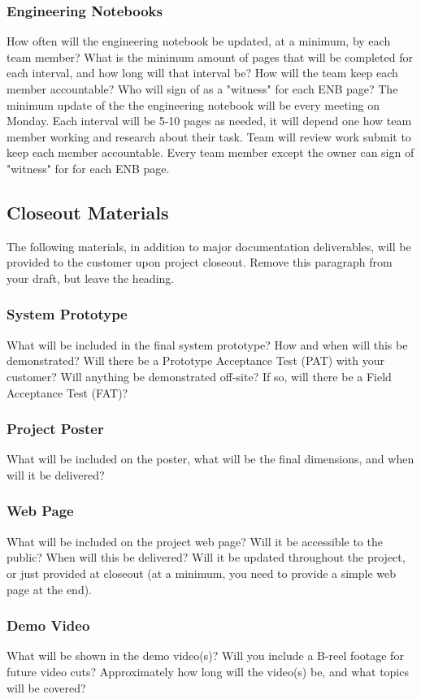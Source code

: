 \subsubsection{Engineering Notebooks}
How often will the engineering notebook be updated, at a minimum, by each team member? What is the minimum amount of pages that will be completed for each interval, and how long will that interval be? How will the team keep each member accountable? Who will sign of as a "witness" for each ENB page? 
The minimum update of the the engineering notebook will be every meeting on Monday. Each interval will be 5-10 pages as needed, it will depend one how team member working and research about their task. Team will review work submit to keep each member accountable. Every team member except the owner can sign of "witness" for for each ENB page. 
\subsection{Closeout Materials}
The following materials, in addition to major documentation deliverables, will be provided to the customer upon project closeout. Remove this paragraph from your draft, but leave the heading.

\subsubsection{System Prototype}
What will be included in the final system prototype? How and when will this be demonstrated? Will there be a Prototype Acceptance Test (PAT) with your customer? Will anything be demonstrated off-site? If so, will there be a Field Acceptance Test (FAT)?

\subsubsection{Project Poster}
What will be included on the poster, what will be the final dimensions, and when will it be delivered?

\subsubsection{Web Page}
What will be included on the project web page? Will it be accessible to the public? When will this be delivered? Will it be updated throughout the project, or just provided at closeout (at a minimum, you need to provide a simple web page at the end).

\subsubsection{Demo Video}
What will be shown in the demo video(s)? Will you include a B-reel footage for future video cuts? Approximately how long will the video(s) be, and what topics will be covered?

